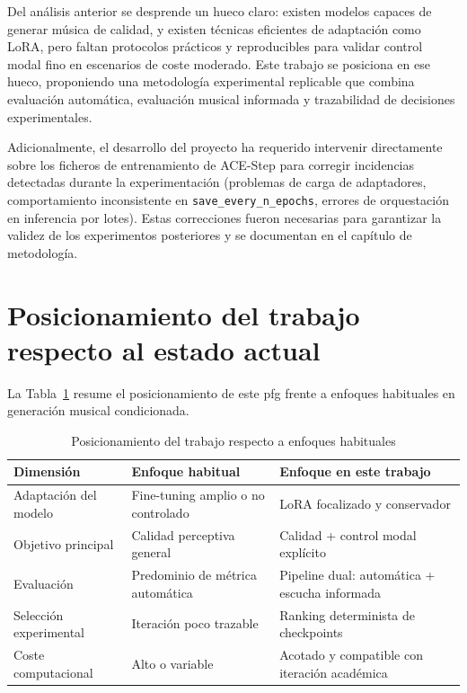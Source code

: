 \documentclass[%
    school=etsisi,%
    type=pfg,%
    degree=61CD,%
]{upm-report}
\begin{document}
Del an\'alisis anterior se desprende un hueco claro: existen modelos capaces de generar m\'usica de calidad, y existen t\'ecnicas eficientes de adaptaci\'on como LoRA, pero faltan protocolos pr\'acticos y reproducibles para validar control modal fino en escenarios de coste moderado. Este trabajo se posiciona en ese hueco, proponiendo una metodolog\'ia experimental replicable que combina evaluaci\'on autom\'atica, evaluaci\'on musical informada y trazabilidad de decisiones experimentales.

Adicionalmente, el desarrollo del proyecto ha requerido intervenir directamente sobre los ficheros de entrenamiento de ACE-Step para corregir incidencias detectadas durante la experimentaci\'on (problemas de carga de adaptadores, comportamiento inconsistente en \texttt{save\_every\_n\_epochs}, errores de orquestaci\'on en inferencia por lotes). Estas correcciones fueron necesarias para garantizar la validez de los experimentos posteriores y se documentan en el cap\'itulo de metodolog\'ia.

\section{Posicionamiento del trabajo respecto al estado actual}

La Tabla~\ref{tab:posicionamiento-trabajo} resume el posicionamiento de este \gls{pfg} frente a enfoques habituales en generaci\'on musical condicionada.

\begin{table}[htbp]
    \centering
    \caption{Posicionamiento del trabajo respecto a enfoques habituales}
    \label{tab:posicionamiento-trabajo}
    \begin{tabular}{lp{4.2cm}p{4.2cm}}
        \toprule
        \textbf{Dimensi\'on} & \textbf{Enfoque habitual} & \textbf{Enfoque en este trabajo} \\
        \midrule
        Adaptaci\'on del modelo & Fine-tuning amplio o no controlado & LoRA focalizado y conservador \\
        Objetivo principal & Calidad perceptiva general & Calidad + control modal expl\'icito \\
        Evaluaci\'on & Predominio de m\'etrica autom\'atica & Pipeline dual: autom\'atica + escucha informada \\
        Selecci\'on experimental & Iteraci\'on poco trazable & Ranking determinista de checkpoints \\
        Coste computacional & Alto o variable & Acotado y compatible con iteraci\'on acad\'emica \\
        \bottomrule
    \end{tabular}
\end{table}
\end{document}
